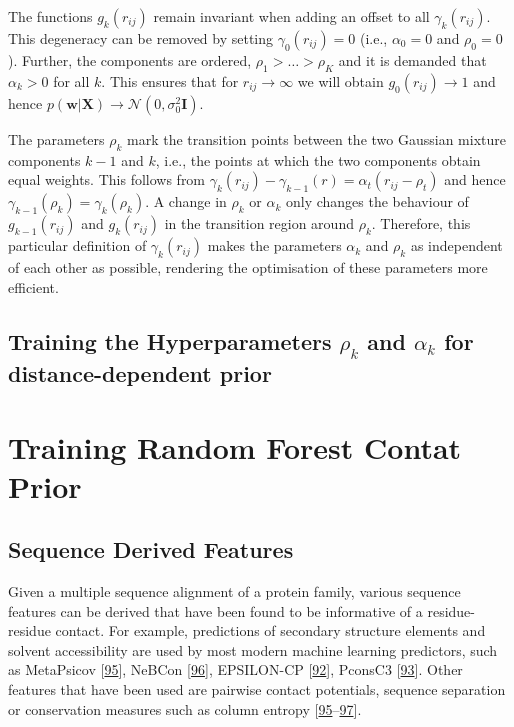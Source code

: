 \documentclass[12pt,a4paper,twoside]{book}
\newcommand{\Gauss}{\mathcal{N}}
\newcommand{\I}{\mathbf{I}}
\newcommand{\rij}{r_{ij}}
\newcommand{\w}{\mathbf{w}}
\newcommand{\X}{\mathbf{X}}
\theoremstyle{definition}
\theoremstyle{definition}
\theoremstyle{remark}
\begin{document}
The functions \(g_k(\rij)\) remain invariant when adding an offset to
all \(\gamma_k(\rij)\). This degeneracy can be removed by setting
\(\gamma_0(\rij) = 0\) (i.e., \(\alpha_0 = 0\) and \(\rho_0=0\)).
Further, the components are ordered, \(\rho_1> \ldots > \rho_K\) and it
is demanded that \(\alpha_k > 0\) for all \(k\). This ensures that for
\(\rij \rightarrow \infty\) we will obtain \(g_0(\rij) \rightarrow 1\)
and hence \(p(\w | \X) \rightarrow \Gauss(0, \sigma_0^2 \I )\).

The parameters \(\rho_k\) mark the transition points between the two
Gaussian mixture components \(k-1\) and \(k\), i.e., the points at which
the two components obtain equal weights. This follows from
\(\gamma_k(\rij) - \gamma_{k-1}(r) = \alpha_{t} ( \rij - \rho_{t})\) and
hence \(\gamma_{k-1}(\rho_k) = \gamma_k(\rho_k)\). A change in
\(\rho_k\) or \(\alpha_k\) only changes the behaviour of
\(g_{k-1}(\rij)\) and \(g_k(\rij)\) in the transition region around
\(\rho_k\). Therefore, this particular definition of \(\gamma_k(\rij)\)
makes the parameters \(\alpha_k\) and \(\rho_k\) as independent of each
other as possible, rendering the optimisation of these parameters more
efficient.

\subsection{\texorpdfstring{Training the Hyperparameters \(\rho_k\) and
\(\alpha_k\) for distance-dependent
prior}{Training the Hyperparameters \textbackslash{}rho\_k and \textbackslash{}alpha\_k for distance-dependent prior}}\label{training-the-hyperparameters-rho_k-and-alpha_k-for-distance-dependent-prior}

\section{Training Random Forest Contat
Prior}\label{training-random-forest-contat-prior}

\subsection{Sequence Derived Features}\label{seq-features}

Given a multiple sequence alignment of a protein family, various
sequence features can be derived that have been found to be informative
of a residue-residue contact. For example, predictions of secondary
structure elements and solvent accessibility are used by most modern
machine learning predictors, such as MetaPsicov
{[}\protect\hyperlink{ref-Jones2015a}{95}{]}, NeBCon
{[}\protect\hyperlink{ref-He2017}{96}{]}, EPSILON-CP
{[}\protect\hyperlink{ref-Stahl2017}{92}{]}, PconsC3
{[}\protect\hyperlink{ref-Skwark2016}{93}{]}. Other features that have
been used are pairwise contact potentials, sequence separation or
conservation measures such as column entropy
{[}\protect\hyperlink{ref-Jones2015a}{95}--\protect\hyperlink{ref-Ma2015a}{97}{]}.
\end{document}
